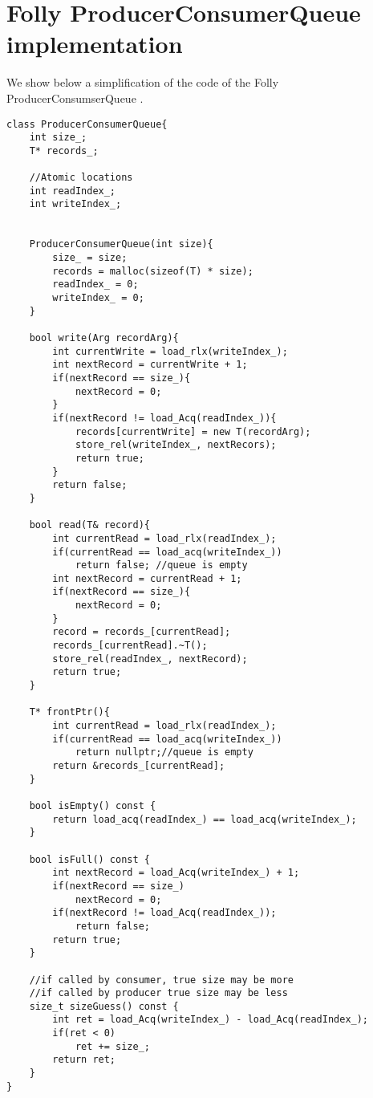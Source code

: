 \chapter{Folly ProducerConsumerQueue implementation}
\label{app:queue}
 We show below a simplification of the code of the Folly ProducerConsumserQueue \cite{queue}.

 \begin{lstlisting}
class ProducerConsumerQueue{
	int size_;
	T* records_;

	//Atomic locations
	int readIndex_;
	int writeIndex_;

	
	ProducerConsumerQueue(int size){
		size_ = size;
		records = malloc(sizeof(T) * size);
		readIndex_ = 0;
		writeIndex_ = 0;
	}	

	bool write(Arg recordArg){
		int currentWrite = load_rlx(writeIndex_);
		int nextRecord = currentWrite + 1;
		if(nextRecord == size_){
			nextRecord = 0;
		}
		if(nextRecord != load_Acq(readIndex_)){
			records[currentWrite] = new T(recordArg);
			store_rel(writeIndex_, nextRecors);
			return true;
		}
		return false;
	}

	bool read(T& record){
		int currentRead = load_rlx(readIndex_);
		if(currentRead == load_acq(writeIndex_))
			return false; //queue is empty
		int nextRecord = currentRead + 1;
		if(nextRecord == size_){
			nextRecord = 0;
		}
		record = records_[currentRead];
		records_[currentRead].~T();
		store_rel(readIndex_, nextRecord);
		return true;
	}

	T* frontPtr(){
		int currentRead = load_rlx(readIndex_);
		if(currentRead == load_acq(writeIndex_))
			return nullptr;//queue is empty
		return &records_[currentRead];
	}
	
	bool isEmpty() const {
		return load_acq(readIndex_) == load_acq(writeIndex_);
	}

	bool isFull() const {
		int nextRecord = load_Acq(writeIndex_) + 1;
		if(nextRecord == size_)
			nextRecord = 0;
		if(nextRecord != load_Acq(readIndex_));
			return false;
		return true;
	}

	//if called by consumer, true size may be more
	//if called by producer true size may be less
	size_t sizeGuess() const {
		int ret = load_Acq(writeIndex_) - load_Acq(readIndex_);
		if(ret < 0)
			ret += size_;
		return ret;
	}
}
 \end{lstlisting}
